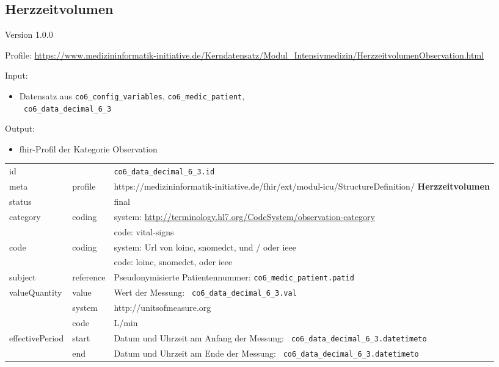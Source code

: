 \subsection{Herzzeitvolumen} 
\noindent Version 1.0.0

\noindent Profile: \url{https://www.medizininformatik-initiative.de/Kerndatensatz/Modul_Intensivmedizin/HerzzeitvolumenObservation.html}

\noindent Input:
\begin{itemize}
	\item Datensatz aus \texttt{co6\_config\_variables}, \texttt{co6\_medic\_patient}, \\ \texttt{
co6\_data\_decimal\_6\_3}
\end{itemize}
Output:
\begin{itemize}
        \item \ac{fhir}-Profil der Kategorie \glqq Observation\grqq{}
\end{itemize}
\begin{longtable}{|l|l|p{7.5cm}|}
        \hline
        \rowcolor{lightgray} \multicolumn{3}{|l|}{Data Mapping (inhaltlich)} \\ \hline
        id &  & \texttt{co6\_data\_decimal\_6\_3.id} \\ \hline
	meta & profile & https://medizininformatik-initiative.de/fhir/ext/modul-icu/StructureDefinition/\textbf{
Herzzeitvolumen} \\ \hline 
	status &  & final  \\ \hline 
	category & coding & system: \url{http://terminology.hl7.org/CodeSystem/observation-category} \\
\cline{3-3}
	& & code: vital-signs \\ \hline
	code & coding & system: Url von \ac{loinc}, \ac{snomedct}, und / oder \ac{ieee} \\ 
	\cline{3-3} 
	 &  & code: \ac{loinc}, \ac{snomedct}, oder \ac{ieee} \\ \hline
	subject & reference & Pseudonymisierte Patientennummer: \texttt{co6\_medic\_patient.patid} \\ \hline
	valueQuantity & value & Wert der Messung: \texttt{
co6\_data\_decimal\_6\_3.val} \\
        \cline{2-3}
         & system & http://unitsofmeasure.org \\
         \cline{2-3}
         & code &
L/min
\\ \hline
    effectivePeriod & start & Datum und Uhrzeit am Anfang der Messung: \texttt{
co6\_data\_decimal\_6\_3.datetimeto} \\
    \cline{2-3}
     & end & Datum und Uhrzeit am Ende der Messung: \texttt{
co6\_data\_decimal\_6\_3.datetimeto} \\ \hline
\end{longtable}


